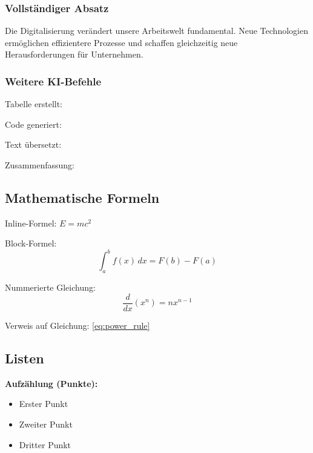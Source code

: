 \documentclass[../main.tex]{subfiles}
\begin{document}
\subsubsection{Vollständiger Absatz}
Die Digitalisierung verändert unsere Arbeitswelt fundamental. Neue Technologien ermöglichen effizientere Prozesse und schaffen gleichzeitig neue Herausforderungen für Unternehmen.

\subsubsection{Weitere KI-Befehle}
Tabelle erstellt: 

Code generiert: 

Text übersetzt: 

Zusammenfassung: 


\subsection{Mathematische Formeln}

Inline-Formel: $E = mc^2$

Block-Formel:
$$\int_{a}^{b} f(x) \, dx = F(b) - F(a)$$

Nummerierte Gleichung:
\begin{equation}
    \frac{d}{dx}(x^n) = nx^{n-1}
    \label{eq:power_rule}
\end{equation}

Verweis auf Gleichung: \cref{eq:power_rule}


\subsection{Listen}

\textbf{Aufzählung (Punkte):}
\begin{itemize}
    \item Erster Punkt
    \item Zweiter Punkt
    \item Dritter Punkt
\end{itemize}
\end{document}
